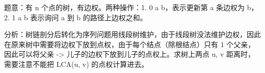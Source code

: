 题意：有 n 个点的树，有边权。两种操作：1. 0 a b，表示更新第 a 条边权为 b，2. 1 a b 表示询问 a 到 b 的路径上边权之和。

分析：树链剖分后转化为序列问题用线段树维护，由于线段树没法维护边权，因此在原来树中需要将边权下放到点权，由于每个结点（除根结点）只有 1 个父亲，因此可以将父亲 -> 儿子的边权下放到儿子的点权上。求树上两点 u, v 距离时，需要注意不能把 LCA(u, v) 的点权计算进去。